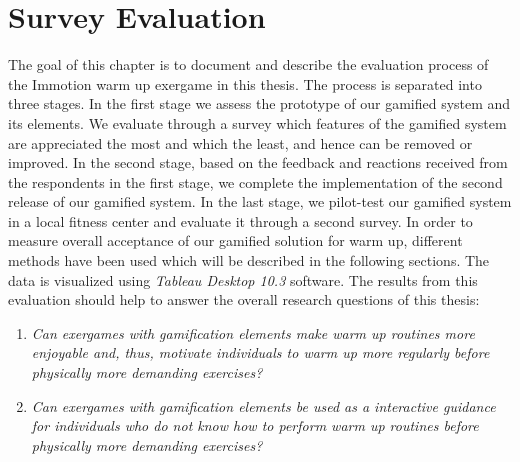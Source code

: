 \chapter{Survey Evaluation}\label{chapter:survey_one}

The goal of this chapter is to document and describe the evaluation process of the Immotion warm up exergame in this thesis. The process is separated into three stages. In the first stage we assess the prototype of our gamified system and its elements. We evaluate through a survey which features of the gamified system are appreciated the most and which the least, and hence can be removed or improved. In the second stage, based on the feedback and reactions received from the respondents in the first stage, we complete the implementation of the second release of our gamified system. In the last stage, we pilot-test our gamified system in a local fitness center and evaluate it through a second survey. In order to measure overall acceptance of our gamified solution for warm up, different methods have been used which will be described in the following sections.  The data is visualized using \textit{Tableau Desktop 10.3} software.  The results from this evaluation should help to answer the overall research questions of this thesis:
\begin{enumerate}
\item \textit{Can exergames with gamification elements make warm up routines more enjoyable and, thus, motivate individuals to warm up more regularly before physically more demanding exercises?}
\item \textit{Can exergames with gamification elements be used as a interactive guidance for individuals who do not know how to perform warm up routines before physically more demanding exercises?}
\end{enumerate} \pagebreak

